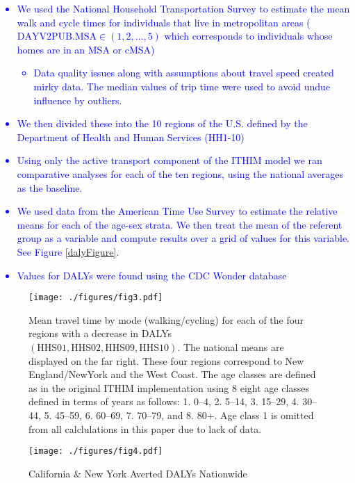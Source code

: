 \documentclass{bioinfo}
\newcommand{\col}[2][red]{\textcolor{#1}{#2}}
\newcommand{\bi}{\begin{itemize}}
\newcommand{\ei}{\end{itemize}}
\begin{document}
\col[blue]{\begin{itemize}
\item We used the National Household Transportation Survey \cite{NHTS} to
  estimate the mean walk and cycle times for individuals that live in
  metropolitan areas ($\textrm{DAYV2PUB.MSA} \in (1,2,\ldots,5)$ which
  corresponds to individuals whose homes are in an MSA or cMSA)
  \bi\item Data quality issues along with assumptions about travel speed
created mirky data.  The median values of trip time were used to avoid
undue influence by outliers.\ei
\item We then divided these into the 10 regions of the U.S. defined by
  the Department of Health and Human Services (HH1-10)
\item Using only the active transport component of the ITHIM model we
  ran comparative analyses for each of the ten regions, using the
  national averages as the baseline.
\item We used data from the American Time Use Survey \cite{ATUS} to
  estimate the relative means for each of the age-sex strata.  We then
  treat the mean of the referent group as a variable and compute
  results over a grid of values for this variable.  See Figure
  \ref{dalyFigure}.
\item Values for DALYs were found using the CDC Wonder database \cite{CDCWonder}
\end{itemize}}

\begin{figure}[t]
  \centerline{\texttt{[image: ./figures/fig3.pdf]}}
    \caption{Mean travel time by mode (walking/cycling) for each of
      the four regions with a decrease in DALYs
      $(\textrm{HHS01},\textrm{HHS02},\textrm{HHS09},\textrm{HHS10})$. The
      national means are displayed on the far right.  These four
      regions correspond to New England/NewYork and the West
      Coast. The age classes are defined as in the original ITHIM
      implementation using 8 eight age classes defined in terms of
      years as follows: 1. 0--4, 2. 5--14, 3. 15--29, 4. 30--44,
      5. 45--59, 6. 60--69, 7. 70--79, and 8. 80+. Age class 1 is
      omitted from all calclulations in this paper due to lack of
      data.}\label{meanMatrices}
\end{figure}

\begin{figure}[t]
  \centerline{\texttt{[image: ./figures/fig4.pdf]}}
    \caption{California \& New York Averted DALYs Nationwide}\label{California}
\end{figure}
\end{document}
